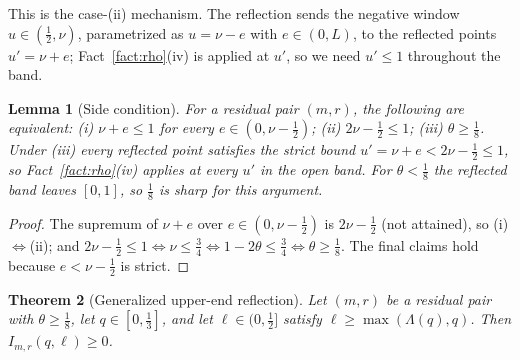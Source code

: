 \documentclass[11pt]{article}
\newtheorem{theorem}{Theorem}[section]
\newtheorem{lemma}[theorem]{Lemma}
\theoremstyle{remark}
\theoremstyle{plain}
\theoremstyle{plain}
\begin{document}
This is the case-(ii) mechanism.  The reflection sends the negative window $u\in(\tfrac12,\nu)$, parametrized as $u=\nu-e$ with $e\in(0,L)$, to the reflected points $u'=\nu+e$; Fact~\ref{fact:rho}(iv) is applied at $u'$, so we need $u'\le1$ throughout the band.

\begin{lemma}[Side condition]\label{lem:side}
For a residual pair $(m,r)$, the following are equivalent: \textup{(i)} $\nu+e\le1$ for every $e\in(0,\nu-\tfrac12)$; \textup{(ii)} $2\nu-\tfrac12\le1$; \textup{(iii)} $\theta\ge\tfrac18$.  Under \textup{(iii)} every reflected point satisfies the strict bound $u'=\nu+e<2\nu-\tfrac12\le1$, so Fact~\ref{fact:rho}(iv) applies at every $u'$ in the open band.  For $\theta<\tfrac18$ the reflected band leaves $[0,1]$, so $\tfrac18$ is sharp for this argument.
\end{lemma}

\begin{proof}
The supremum of $\nu+e$ over $e\in(0,\nu-\tfrac12)$ is $2\nu-\tfrac12$ (not attained), so (i)$\Leftrightarrow$(ii); and $2\nu-\tfrac12\le1\iff\nu\le\tfrac34\iff1-2\theta\le\tfrac34\iff\theta\ge\tfrac18$.  The final claims hold because $e<\nu-\tfrac12$ is strict.
\end{proof}

\begin{theorem}[Generalized upper-end reflection]\label{thm:reflection}
Let $(m,r)$ be a residual pair with $\theta\ge\tfrac18$, let $q\in[0,\tfrac13]$, and let $\ell\in(0,\tfrac12]$ satisfy $\ell\ge\max(\Lambda(q),q)$.  Then $I_{m,r}(q,\ell)\ge0$.
\end{theorem}
\end{document}
